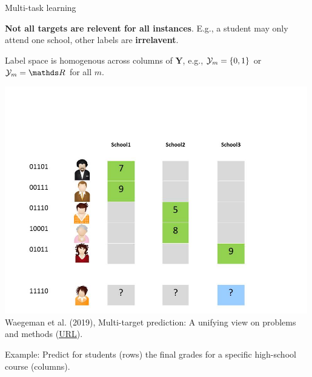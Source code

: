 \documentclass[11pt,compress,t,notes=noshow, xcolor=table]{beamer}
\begin{document}
\begin{frame}{Multi-task learning}

		\begin{itemize}
			
			\begin{minipage}{0.45\textwidth}  

                \item \textbf{Not all targets are relevent for all instances}. E.g., a student may only attend one school, other labels are \textbf{irrelavent}.
                

       
				\item Label space is homogenous across columns of $\bm{Y}$, e.g., $\mathcal{Y}_m = \{0,1\}$ or $\Yspace_m = \R$ for all $m$.

			\end{minipage}
            \hfill
			\begin{minipage}{0.45\textwidth}    
				\begin{center} 	
					\includegraphics[width=0.99\textwidth,trim = 0 0 100 100,clip]{figure/Slide3} \tiny
					\\ Waegeman et al. (2019), Multi-target prediction:
					A unifying view on problems and methods (\href{https://arxiv.org/pdf/1809.02352.pdf}{\underline{URL}}).	
				\end{center}
			\end{minipage}
		\end{itemize}
	Example: Predict for students (rows) the final grades for a specific high-school course (columns).


\end{frame}
\end{document}
